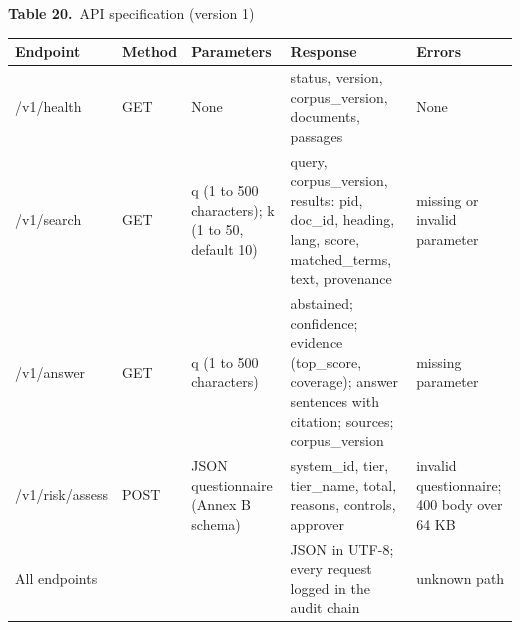 \documentclass[border=10pt]{standalone}
\begin{document}
\begin{minipage}{17cm}
{\large\bfseries Table 20.}\ {\large API specification (version 1)}\par\vspace{7pt}
\small
{}
\begin{tabularx}{\linewidth}{@{}>{\hsize=1.105\hsize\raggedright\arraybackslash}X>{\hsize=0.407\hsize\raggedright\arraybackslash}X>{\hsize=1.163\hsize\raggedright\arraybackslash}X>{\hsize=1.512\hsize\raggedright\arraybackslash}X>{\hsize=0.814\hsize\raggedright\arraybackslash}X@{}}
\arrayrulecolor{bapilrule}\toprule
\rowcolor{white}\textbf{Endpoint} & \textbf{Method} & \textbf{Parameters} & \textbf{Response} & \textbf{Errors} \\
\midrule
/\allowbreak{}v1/\allowbreak{}health & GET & None & status, version, corpus\_version, documents, passages & None \\
/\allowbreak{}v1/\allowbreak{}search & GET & q (1 to 500 characters); k (1 to 50, default 10) & query, corpus\_version, results: pid, doc\_id, heading, lang, score, matched\_terms, text, provenance & 400 missing or invalid parameter \\
/\allowbreak{}v1/\allowbreak{}answer & GET & q (1 to 500 characters) & abstained; confidence; evidence (top\_score, coverage); answer sentences with citation; sources; corpus\_version & 400 missing parameter \\
/\allowbreak{}v1/\allowbreak{}risk/\allowbreak{}assess & POST & JSON questionnaire (Annex B schema) & system\_id, tier, tier\_name, total, reasons, controls, approver & 400 invalid questionnaire; 400 body over 64 KB \\
All endpoints &  &  & JSON in UTF-8; every request logged in the audit chain & 404 unknown path \\
\bottomrule
\end{tabularx}
\par{}
\end{minipage}
\end{document}
